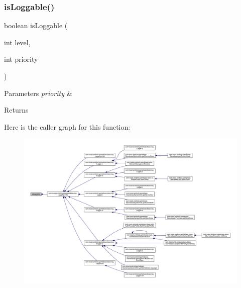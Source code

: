 \subsubsection{\texorpdfstring{is\+Loggable()}{isLoggable()}}
{\footnotesize\ttfamily boolean is\+Loggable (\begin{DoxyParamCaption}\item[{int}]{level,  }\item[{int}]{priority }\end{DoxyParamCaption})}


\begin{DoxyParams}{Parameters}
{\em priority} & \\
\hline
\end{DoxyParams}
\begin{DoxyReturn}{Returns}

\end{DoxyReturn}
Here is the caller graph for this function\+:
\nopagebreak
\begin{figure}[H]
\begin{center}
\leavevmode
\includegraphics[width=350pt]{interfacecom_1_1toast_1_1android_1_1gamebase_1_1base_1_1log_1_1_loggable_ae2a866830adbdc50eb134bb313859c7e_icgraph}
\end{center}
\end{figure}
\mbox{\label{interfacecom_1_1toast_1_1android_1_1gamebase_1_1base_1_1log_1_1_loggable_a3eda0a47ad01e3e0668cbf6dafc14db2}} 
